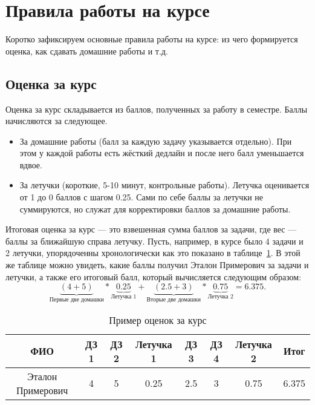 \section{Правила работы на курсе}

Коротко зафиксируем основные правила работы на курсе: из чего формируется оценка, как сдавать домашние работы и т.д.

\subsection{Оценка за курс}

Оценка за курс складывается из баллов, полученных за работу в семестре. Баллы начисляются за следующее.
\begin{itemize}
    \item За домашние работы (балл за каждую задачу указывается отдельно). При этом у каждой работы есть жёсткий дедлайн и после него балл уменьшается вдвое.
    \item За летучки (короткие, 5-10 минут, контрольные работы). Летучка оценивается от 1 до 0 баллов с шагом 0.25. Сами по себе баллы за летучки не суммируются, но служат для корректировки баллов за домашние работы.
\end{itemize}

Итоговая оценка за курс --- это взвешенная сумма баллов за задачи, где вес --- баллы за ближайшую справа летучку.
Пусть, например, в курсе было 4 задачи и 2 летучки, упорядоченны хронологически как это показано в таблице~\ref{tbl:grad_example}. 
В этой же таблице можно увидеть, какие баллы получил Эталон Примерович за задачи и летучки, а также его итоговый балл, который вычисляется следующим образом:
$$
\underbrace{(4+5)}_{\text{Первые две домашки}}*\underbrace{0.25}_{\text{Летучка 1}} + \underbrace{(2.5+3)}_{\text{Вторые две домашки}}*\underbrace{0.75}_{\text{Летучка 2}} = 6.375.
$$

\begin{table}[h]
    \caption{Пример оценок за курс}
    \label{tbl:grad_example}
\begin{center}
    \begin{tabular}{ | c | c | c | c | c | c | c | c |}
        \hline
        ФИО & ДЗ 1 & ДЗ 2 & Летучка 1 & ДЗ 3 & ДЗ 4 & Летучка 2 &  Итог \\ 
        \hline
        \hline
        Эталон Примерович & 4 & 5 & 0.25 & 2.5 & 3 & 0.75 & 6.375 \\  
        \hline
    \end{tabular}
\end{center}
\end{table}


